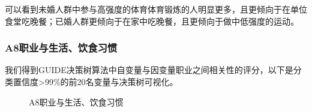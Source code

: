 \documentclass{article}
\numberwithin{equation}{subsection}
\begin{document}
可以看到未婚人群中参与高强度的体育体育锻炼的人明显更多，且更倾向于在单位食堂吃晚餐；已婚人群更倾向于在家中吃晚餐，且更倾向于做中低强度的运动。
\subsubsection{A8职业与生活、饮食习惯}
我们得到GUIDE决策树算法中自变量与因变量职业之间相关性的评分，以下是分类置信度>99\%的前20名变量与决策树可视化。
\begin{figure}[htbp]
    \centering
    \quad
    \caption{A8职业与生活、饮食习惯}
\end{figure}
\end{document}
